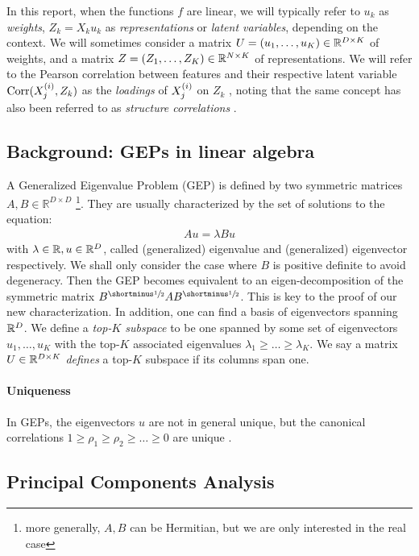 In this report, when the functions $f$ are linear, we will typically refer to $u_k$ as \textit{\gls{weights}}, $Z_k = X_k u_k$ as \textit{\gls{representations}} or \textit{\gls{latent variables}}, depending on the context. We will sometimes consider a
matrix $U = \left(u_1, \dots, u_K\right) \in \mathbb{R}^{D \times K}$ of \gls{weights}, and a
matrix $Z = \left(Z_1, \dots, Z_K\right) \in \mathbb{R}^{N \times K}$ of representations.
We will refer to the Pearson correlation between features and their respective latent variable $\operatorname{Corr}(X^{(i)}_j, Z_k)$ as the \textit{\gls{loadings}} of $X^{(i)}_j$ on $Z_k$ \citep{rosipal2005overview}, noting that the same concept has also been referred to as \textit{structure correlations} \citep{meredith1964canonical}.

\subsection{Background: GEPs in linear algebra}
A Generalized Eigenvalue Problem (GEP) is defined by two symmetric matrices $A,B\in \mathbb{R}^{D\times D}$ \citep{stewart_matrix_1990}\footnote{more generally, $A,B$ can be Hermitian, but we are only interested in the real case}. They are usually characterized by the set of solutions to the equation:
\begin{align}
    \label{eq:igep}
    Au=\lambda Bu
\end{align}
with $\lambda \in \mathbb{R}, u \in \mathbb{R}^D$, called (generalized) eigenvalue and (generalized) eigenvector respectively. We shall only consider the case where $B$ is positive definite to avoid degeneracy.
Then the GEP becomes equivalent to an eigen-decomposition of the symmetric matrix $B^\mhalf A B^\mhalf$. This is key to the proof of our new characterization.
In addition, one can find a basis of eigenvectors spanning $\mathbb{R}^D$.
We define a \textit{top-$K$ subspace} to be one spanned by some set of eigenvectors {$u_1,\dots,u_K$} with the top-$K$ associated eigenvalues $\lambda_1 \geq \dots \geq \lambda_K$.
We say a matrix $U \in \mathbb{R}^{D \times K}$ \textit{defines} a top-$K$ subspace if its columns span one.

\paragraph{Uniqueness}
In GEPs, the eigenvectors $u$ are not in general unique, but the canonical correlations $1 \geq \rho_1 \geq \rho_2 \geq \dots \geq 0$ are unique \citep{mills1988calculation}.

\subsection{Principal Components Analysis}

